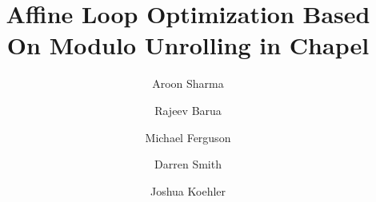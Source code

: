 \documentclass[10pt,letterpaper,twocolumn]{article}
\begin{document}
\title{Affine Loop Optimization Based On Modulo Unrolling in Chapel}
\author[1]{Aroon Sharma}
\author[1]{Rajeev Barua}
\author[2]{Michael Ferguson}
\author[1]{Darren Smith}
\author[1]{Joshua Koehler}

           
\maketitle









%

%


%


{
\begin{singlespace}
\vspace{-3ex}

\vspace{-2ex}

\end{singlespace}
}
\end{document}
